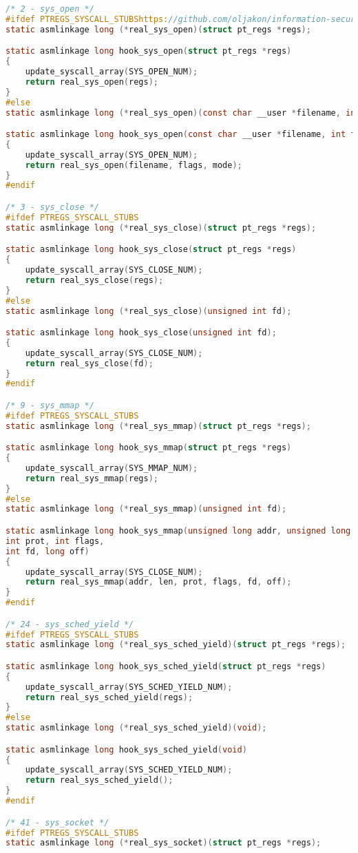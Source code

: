 \begin{lstlisting}[label=lst:log, caption=Листинг файла hooks.c, language=c]
/* 2 - sys_open */
#ifdef PTREGS_SYSCALL_STUBShttps://github.com/oljakon/information-security/blob/master/lab4_RSA/main.py
static asmlinkage long (*real_sys_open)(struct pt_regs *regs);

static asmlinkage long hook_sys_open(struct pt_regs *regs)
{
	update_syscall_array(SYS_OPEN_NUM);
	return real_sys_open(regs);
}
#else
static asmlinkage long (*real_sys_open)(const char __user *filename, int flags, umode_t mode);

static asmlinkage long hook_sys_open(const char __user *filename, int flags, umode_t mode);
{
	update_syscall_array(SYS_OPEN_NUM);
	return real_sys_open(filename, flags, mode);
}
#endif

/* 3 - sys_close */
#ifdef PTREGS_SYSCALL_STUBS
static asmlinkage long (*real_sys_close)(struct pt_regs *regs);

static asmlinkage long hook_sys_close(struct pt_regs *regs)
{
	update_syscall_array(SYS_CLOSE_NUM);
	return real_sys_close(regs);
}
#else
static asmlinkage long (*real_sys_close)(unsigned int fd);

static asmlinkage long hook_sys_close(unsigned int fd);
{
	update_syscall_array(SYS_CLOSE_NUM);
	return real_sys_close(fd);
}
#endif

/* 9 - sys_mmap */
#ifdef PTREGS_SYSCALL_STUBS
static asmlinkage long (*real_sys_mmap)(struct pt_regs *regs);

static asmlinkage long hook_sys_mmap(struct pt_regs *regs)
{
	update_syscall_array(SYS_MMAP_NUM);
	return real_sys_mmap(regs);
}
#else
static asmlinkage long (*real_sys_mmap)(unsigned int fd);

static asmlinkage long hook_sys_mmap(unsigned long addr, unsigned long len,
int prot, int flags,
int fd, long off)
{
	update_syscall_array(SYS_CLOSE_NUM);
	return real_sys_mmap(addr, len, prot, flags, fd, off);
}
#endif

/* 24 - sys_sched_yield */
#ifdef PTREGS_SYSCALL_STUBS
static asmlinkage long (*real_sys_sched_yield)(struct pt_regs *regs);

static asmlinkage long hook_sys_sched_yield(struct pt_regs *regs)
{
	update_syscall_array(SYS_SCHED_YIELD_NUM);
	return real_sys_sched_yield(regs);
}
#else
static asmlinkage long (*real_sys_sched_yield)(void);

static asmlinkage long hook_sys_sched_yield(void)
{
	update_syscall_array(SYS_SCHED_YIELD_NUM);
	return real_sys_sched_yield();
}
#endif

/* 41 - sys_socket */
#ifdef PTREGS_SYSCALL_STUBS
static asmlinkage long (*real_sys_socket)(struct pt_regs *regs);


\end{lstlisting}
